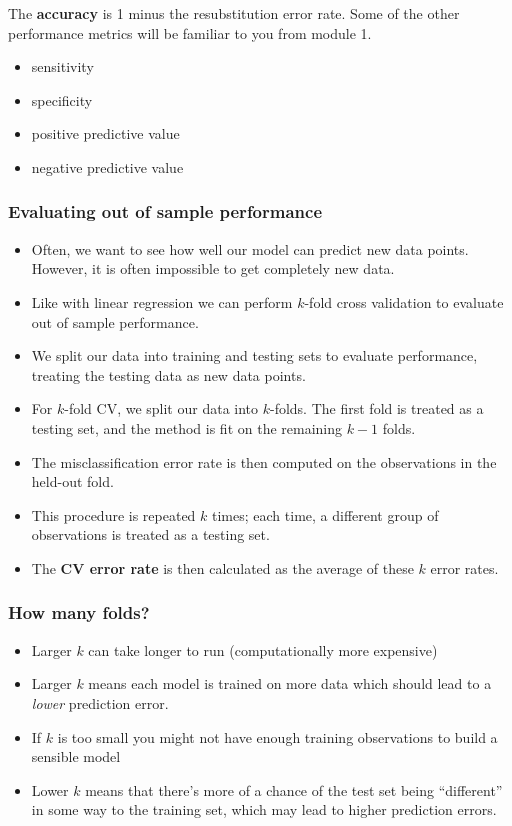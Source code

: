 \documentclass[a4paper]{article}
\begin{document}
The \textbf{accuracy} is 1 minus the resubstitution error rate.
Some of the other performance metrics will be familiar to you from module 1.
\begin{itemize}
	\item sensitivity
	\item specificity
	\item positive predictive value
	\item negative predictive value
\end{itemize}
\subsubsection{Evaluating out of sample performance}
\begin{itemize}
	\item Often, we want to see how well our model can predict new data points. However, it is often impossible to get completely new data.
	\item Like with linear regression we can perform \( k \)-fold cross validation to evaluate out of sample performance.
	\item We split our data into training and testing sets to evaluate performance, treating the testing data as new data points.
	\item For \( k \)-fold CV, we split our data into \( k \)-folds. The first fold is treated as a testing set, and the method is fit on the remaining \( k-1 \) folds.
	\item The misclassification error rate is then computed on the observations in the held-out fold.
	\item This procedure is repeated \( k \) times; each time, a different group of observations is treated as a testing set.
	\item The \textbf{CV error rate} is then calculated as the average of these \( k \) error rates.
\end{itemize}
\subsubsection{How many folds?}
\begin{itemize}
	\item Larger \( k \) can take longer to run (computationally more expensive)
	\item Larger \( k \) means each model is trained on more data which should lead to a \textit{lower} prediction error.
	\item If \( k \) is too small you might not have enough training observations to build a sensible model
	\item Lower \( k \) means that there's more of a chance of the test set being ``different'' in some way to the training set, which may lead to higher prediction errors.
\end{itemize}
\end{document}
